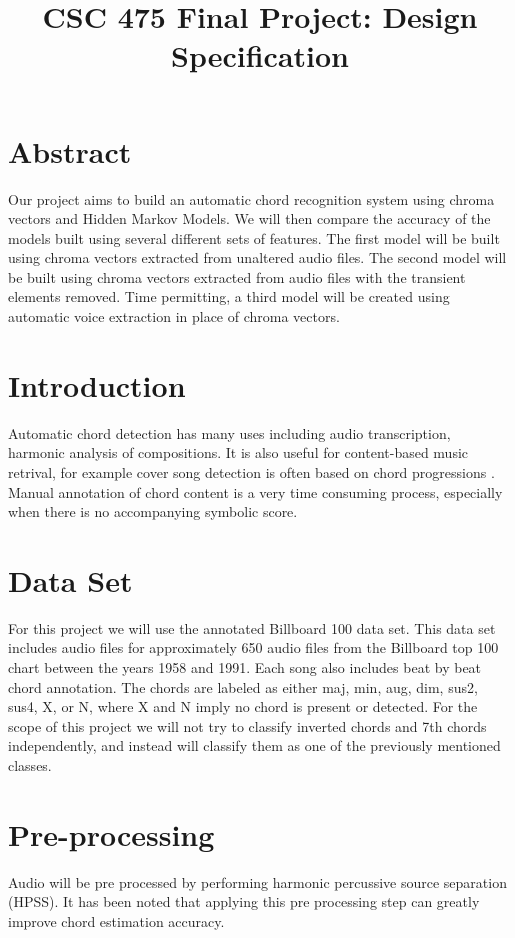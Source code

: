 \documentclass{article}
\title{CSC 475 Final Project: Design Specification}
\begin{document}
%
\maketitle
%

\section{Abstract}\label{sec:desoutline}
Our project aims to build an automatic chord recognition system using chroma
vectors and Hidden Markov Models. We will then compare the accuracy
of the models built using several different sets of features. The first model
will be built using chroma vectors extracted from unaltered audio files. The
second model will be built using chroma vectors extracted from audio files with
the transient elements removed. Time permitting, a third model will be created
using automatic voice extraction in place of chroma vectors.

\section{Introduction}\label{sec:intro}

Automatic chord detection has many uses including audio transcription, harmonic
analysis of compositions. It is also useful for content-based music retrival,
for example cover song detection is often based on chord progressions
\cite{Papadopoulos:18}.  Manual annotation of chord content is a very time
consuming process, especially when there is no accompanying symbolic score.

\section{Data Set}

For this project we will use the annotated Billboard 100 data set. This data
set includes audio files for approximately 650 audio files from the Billboard
top 100 chart between the years 1958 and 1991. Each song also includes beat by
beat chord annotation\cite{Burgoyne:07}. The chords are labeled as either maj,
min, aug, dim, sus2, sus4, X, or N, where X and N imply no chord is present or
detected.  For the scope of this project we will not try to classify inverted
chords and 7th chords independently, and instead will classify them as one of
the previously mentioned classes.

\section{Pre-processing}
Audio will be pre processed by performing harmonic percussive source separation
(HPSS). It has been noted that applying this pre processing step can greatly
improve chord estimation accuracy\cite{Reed:09}.
\end{document}
